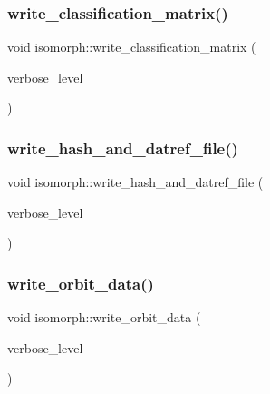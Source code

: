 \subsubsection{\texorpdfstring{write\+\_\+classification\+\_\+matrix()}{write\_classification\_matrix()}}
{\footnotesize\ttfamily void isomorph\+::write\+\_\+classification\+\_\+matrix (\begin{DoxyParamCaption}\item[{\mbox{\hyperlink{galois_8h_a09fddde158a3a20bd2dcadb609de11dc}{I\+NT}}}]{verbose\+\_\+level }\end{DoxyParamCaption})}

\mbox{\label{classisomorph_ad4807ab9c5da6368407eb33e1767c6dd}} 
\subsubsection{\texorpdfstring{write\+\_\+hash\+\_\+and\+\_\+datref\+\_\+file()}{write\_hash\_and\_datref\_file()}}
{\footnotesize\ttfamily void isomorph\+::write\+\_\+hash\+\_\+and\+\_\+datref\+\_\+file (\begin{DoxyParamCaption}\item[{\mbox{\hyperlink{galois_8h_a09fddde158a3a20bd2dcadb609de11dc}{I\+NT}}}]{verbose\+\_\+level }\end{DoxyParamCaption})}

\mbox{\label{classisomorph_ad61230007c9a9698dca8a499287b322f}} 
\subsubsection{\texorpdfstring{write\+\_\+orbit\+\_\+data()}{write\_orbit\_data()}}
{\footnotesize\ttfamily void isomorph\+::write\+\_\+orbit\+\_\+data (\begin{DoxyParamCaption}\item[{\mbox{\hyperlink{galois_8h_a09fddde158a3a20bd2dcadb609de11dc}{I\+NT}}}]{verbose\+\_\+level }\end{DoxyParamCaption})}

